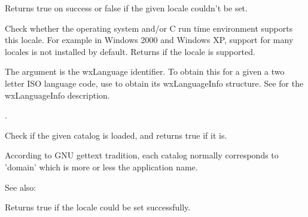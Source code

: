 Returns true on success or false if the given locale couldn't be set.


\label{wxlocaleisavailable}


Check whether the operating system and/or C run time environment supports
this locale. For example in Windows 2000 and Windows XP, support for many
locales is not installed by default. Returns \true if the locale is
supported.

The argument  is the wxLanguage identifier. To obtain this for a
given a two letter ISO language code, use 
 to obtain its
wxLanguageInfo structure. See  for
the wxLanguageInfo description.

. 


\label{wxlocaleisloaded}


Check if the given catalog is loaded, and returns true if it is.

According to GNU gettext tradition, each catalog
normally corresponds to 'domain' which is more or less the application name.

See also: 


\label{wxlocaleisok}


Returns true if the locale could be set successfully.

